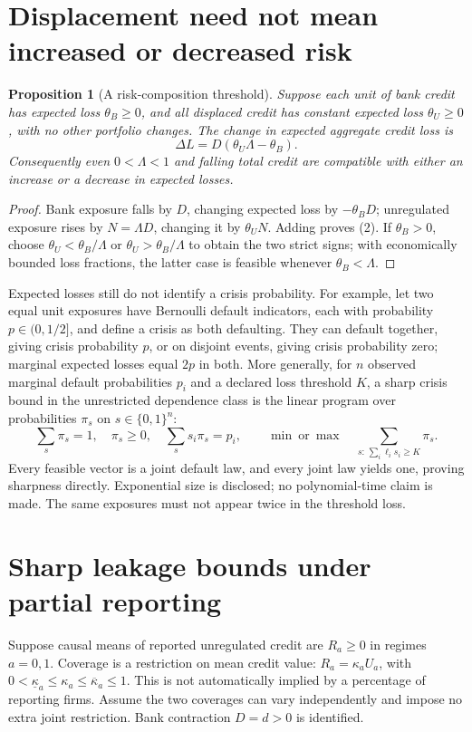 \documentclass[11pt]{article}
\newtheorem{proposition}[theorem]{Proposition}
\theoremstyle{remark}
\begin{document}
\section{Displacement need not mean increased or decreased risk}
\begin{proposition}[A risk-composition threshold]
Suppose each unit of bank credit has expected loss $\theta_B\geq0$,
and all displaced credit has constant expected loss $\theta_U\geq0$,
with no other portfolio changes. The change in expected aggregate credit
loss is
\[
 \Delta L=D(\theta_U\Lambda-\theta_B).                            \tag{2}
\]
Consequently even $0<\Lambda<1$ and falling total credit are compatible
with either an increase or a decrease in expected losses.
\end{proposition}
\begin{proof}
Bank exposure falls by $D$, changing expected loss by $-\theta_BD$;
unregulated exposure rises by $N=\Lambda D$, changing it by
$\theta_UN$. Adding proves (2). If $\theta_B>0$, choose
$\theta_U<\theta_B/\Lambda$ or $\theta_U>\theta_B/\Lambda$ to obtain
the two strict signs; with economically bounded loss fractions, the latter
case is feasible whenever $\theta_B<\Lambda$.
\end{proof}
Expected losses still do not identify a crisis probability. For example,
let two equal unit exposures have Bernoulli default indicators, each with
probability $p\in(0,1/2]$, and define a crisis as both defaulting. They
can default together, giving crisis probability $p$, or on disjoint
events, giving crisis probability zero; marginal expected losses equal
$2p$ in both. More generally, for $n$ observed marginal default
probabilities $p_i$ and a declared loss threshold $K$, a sharp crisis
bound in the unrestricted dependence class is the linear program over
probabilities $\pi_s$ on $s\in\{0,1\}^n$:
\[
 \sum_s\pi_s=1,\quad \pi_s\geq0,\quad
 \sum_s s_i\pi_s=p_i,
 \qquad \min\ \text{or}\ \max\quad
 \sum_{s:\,\sum_i\ell_i s_i\geq K}\pi_s.                          \tag{3}
\]
Every feasible vector is a joint default law, and every joint law yields
one, proving sharpness directly. Exponential size is disclosed; no
polynomial-time claim is made. The same exposures must not appear twice
in the threshold loss.

\section{Sharp leakage bounds under partial reporting}
Suppose causal means of reported unregulated credit are $R_a\geq0$ in
regimes $a=0,1$. Coverage is a restriction on mean credit value:
$R_a=\kappa_aU_a$, with
$0<\underline\kappa_a\leq\kappa_a\leq\overline\kappa_a\leq1$.
This is not automatically implied by a percentage of reporting firms.
Assume the two coverages can vary independently and impose no extra
joint restriction. Bank contraction $D=d>0$ is identified.
\end{document}

